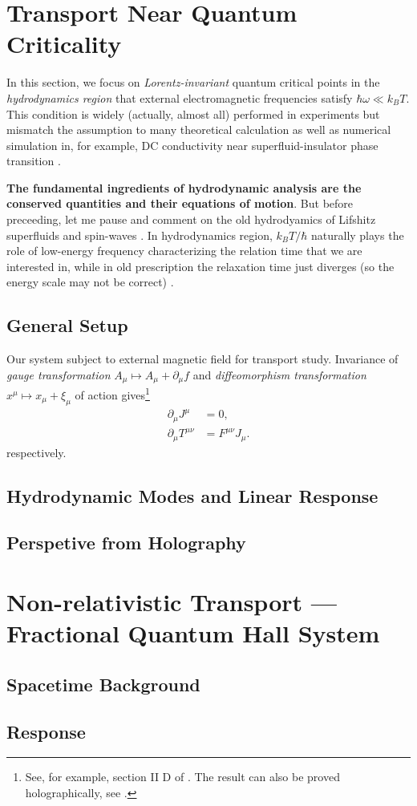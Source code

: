 \documentclass[10pt,nofootinbib]{revtex4}
\begin{document}
\section{Transport Near Quantum Criticality}
	In this section, we focus on \emph{Lorentz-invariant} quantum critical points in the \emph{hydrodynamics region} that external electromagnetic frequencies satisfy $\hbar\omega\ll k_B T$. This condition is widely (actually, almost all) performed in experiments but mismatch the assumption to many theoretical calculation as well as numerical simulation in, for example, DC conductivity near superfluid-insulator phase transition \cite{damle1997nonzero}.\par
	\textbf{The fundamental ingredients of hydrodynamic analysis are the conserved quantities and their equations of motion}. But before preceeding, let me pause and comment on the old hydrodyamics of Lifshitz superfluids and spin-waves \cite{hohenberg1977theory,halperin1969hydrodynamic}. {\color{red} In hydrodynamics region, $k_BT/\hbar$ naturally plays the role of low-energy frequency characterizing the relation time that we are interested in, while in old prescription the relaxation time just diverges (so the energy scale may not be correct) \cite{hartnoll2007theory}}.

	\subsection{General Setup}
		Our system subject to external magnetic field for transport study. Invariance of \emph{gauge transformation} $A_\mu\mapsto A_\mu+\partial_\mu f$ and \emph{diffeomorphism transformation} $x^\mu\mapsto x_\mu+\xi_\mu$ of action gives\footnote{See, for example, section II D of \cite{herzog2009lectures}. The result can also be proved holographically, see \cite{lindgren2015holographic}.}
		\begin{align}\label{5.1.1}
			\partial_\mu J^\mu&=0,\\
			\partial_\mu T^{\mu\nu}&=F^{\mu\nu}J_\mu.
		\end{align}
		respectively.
		
	\subsection{Hydrodynamic Modes and Linear Response}
	\subsection{Perspetive from Holography}

\section{Non-relativistic Transport --- Fractional Quantum Hall System}
	\subsection{Spacetime Background}
	\subsection{Response}



\end{document}
